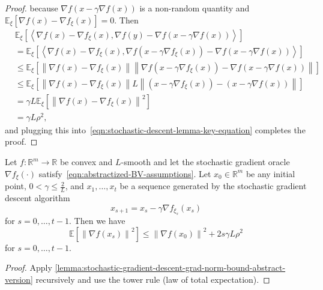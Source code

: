 \documentclass{article}
\newcommand{\reals}{\mathbb{R}}
\newcommand{\inprod}[2]{\left\langle #1,#2 \right\rangle}
\newcommand{\sqnorm}[1]{\left\| #1 \right\|^2}
\newcommand{\norm}[1]{\left\|#1\right\|}
\theoremstyle{plain}
\theoremstyle{remark}
\begin{document}
\begin{proof}
because $\nabla f(x-\gamma\nabla f(x))$ is a non-random quantity and $\mathbb{E}_\xi [\nabla f(x) - \nabla f_\xi(x)] = 0$.
Then
\begin{align*}
    & \mathbb{E}_\xi \left[ \inprod{\nabla f(x) - \nabla f_\xi(x)}{\nabla f(y) - \nabla f(x - \gamma\nabla f(x))} \right] \\
    & = \mathbb{E}_\xi \left[ \inprod{\nabla f(x) - \nabla f_\xi(x)}{\nabla f(x - \gamma\nabla f_\xi(x)) - \nabla f(x - \gamma\nabla f(x))} \right] \\
    & \le \mathbb{E}_\xi \left[ \norm{\nabla f(x) - \nabla f_\xi(x)} \norm{\nabla f(x - \gamma\nabla f_\xi(x)) - \nabla f(x - \gamma\nabla f(x))} \right] \\
    & \le \mathbb{E}_\xi \left[ \norm{\nabla f(x) - \nabla f_\xi(x)} L \norm{(x - \gamma\nabla f_\xi(x)) - (x - \gamma\nabla f(x))} \right] \\
    & = \gamma L \mathbb{E}_\xi \left[ \sqnorm{\nabla f(x) - \nabla f_\xi(x)} \right] \\
    & = \gamma L \rho^2 ,
\end{align*}
and plugging this into~\eqref{eqn:stochastic-descent-lemma-key-equation} completes the proof.

\end{proof}

\begin{lemma}
\label{lemma:stochastic-gradient-descent-grad-norm-bound-abstract-version-for-skipped-iterates}

Let $f \colon \reals^m \to \reals$ be convex and $L$-smooth and let the stochastic gradient oracle $\nabla f_\xi (\cdot)$ satisfy~\eqref{eqn:abstractized-BV-assumptions}.
Let $x_0 \in \reals^m$ be any initial point, $0 < \gamma \le \frac{2}{L}$,  and $x_1,\dots,x_t$ be a sequence generated by the stochastic gradient descent algorithm
\[
    x_{s+1} = x_s - \gamma \nabla f_{\xi_s} (x_s) 
\]
for $s=0,\dots,t-1$.
Then we have
\[
    \mathbb{E} \left[ \sqnorm{\nabla f(x_s)} \right] \le \sqnorm{\nabla f(x_0)} + 2s \gamma L \rho^2 
\]
for $s=0,\dots,t-1$.

\end{lemma}

\begin{proof}

Apply \cref{lemma:stochastic-gradient-descent-grad-norm-bound-abstract-version} recursively and use the tower rule (law of total expectation).

\end{proof}
\end{document}

